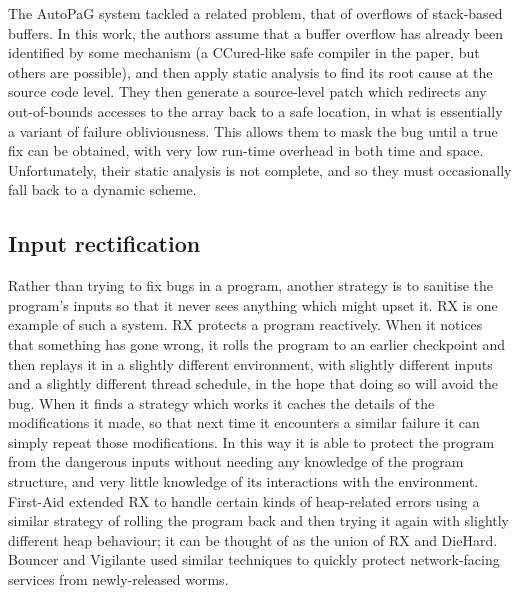 The AutoPaG system\cite{Lin2007} tackled a related problem, that of
overflows of stack-based buffers.  In this work, the authors assume
that a buffer overflow has already been identified by some mechanism
(a CCured\cite{Necula2005}-like safe compiler in the paper, but others
are possible), and then apply static analysis to find its root cause
at the source code level.  They then generate a source-level patch
which redirects any out-of-bounds accesses to the array back to a safe
location, in what is essentially a variant of failure obliviousness.
This allows them to mask the bug until a true fix can be obtained,
with very low run-time overhead in both time and space.
Unfortunately, their static analysis is not complete, and so they
must occasionally fall back to a dynamic scheme.

\subsection{Input rectification}


Rather than trying to fix bugs in a program, another strategy is to
sanitise the program's inputs so that it never sees anything which
might upset it.  RX\cite{Qin2007} is one example of such a system.  RX
protects a program reactively.  When it notices that something has
gone wrong, it rolls the program to an earlier checkpoint and then
replays it in a slightly different environment, with slightly
different inputs and a slightly different thread schedule, in the hope
that doing so will avoid the bug.  When it finds a strategy which
works it caches the details of the modifications it made, so that next
time it encounters a similar failure it can simply repeat those
modifications.  In this way it is able to protect the program from the
dangerous inputs without needing any knowledge of the program
structure, and very little knowledge of its interactions with the
environment.  First-Aid\cite{Gao2009} extended RX to handle certain
kinds of heap-related errors using a similar strategy of rolling the
program back and then trying it again with slightly different heap
behaviour; it can be thought of as the union of RX and DieHard.
Bouncer\cite{Costa2007} and Vigilante\cite{Costa2008} used similar
techniques to quickly protect network-facing services from
newly-released worms.

